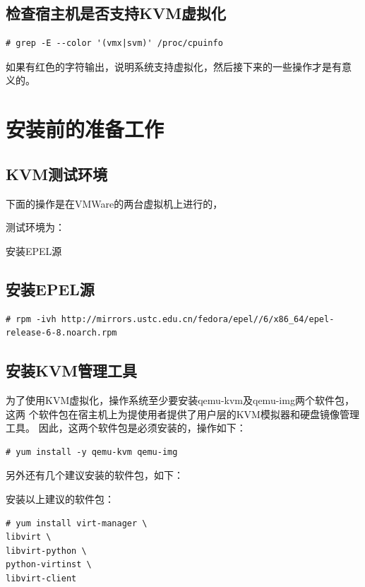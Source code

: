 \subsection{检查宿主机是否支持KVM虚拟化}
\label{sec:checkIfSupportKVM}

\begin{verbatim}
# grep -E --color '(vmx|svm)' /proc/cpuinfo
\end{verbatim}

如果有红色的字符输出，说明系统支持虚拟化，然后接下来的一些操作才是有意
义的。

\section{安装前的准备工作}
\label{sec:kvmPrepare}

\subsection{KVM测试环境}
\label{sec:testEnv}

下面的操作是在VMWare的两台虚拟机上进行的，

测试环境为：

安装EPEL源

\subsection{安装EPEL源}
\label{sec:InstallEpel}

\begin{verbatim}
# rpm -ivh http://mirrors.ustc.edu.cn/fedora/epel//6/x86_64/epel-release-6-8.noarch.rpm
\end{verbatim}

\subsection{安装KVM管理工具}
\label{sec:InstallKvmManager}

为了使用KVM虚拟化，操作系统至少要安装qemu-kvm及qemu-img两个软件包，这两
个软件包在宿主机上为提使用者提供了用户层的KVM模拟器和硬盘镜像管理工具。
因此，这两个软件包是必须安装的，操作如下：

\begin{verbatim}
# yum install -y qemu-kvm qemu-img
\end{verbatim}

另外还有几个建议安装的软件包，如下：

安装以上建议的软件包：

\begin{verbatim}
# yum install virt-manager \
libvirt \
libvirt-python \
python-virtinst \
libvirt-client
\end{verbatim}

